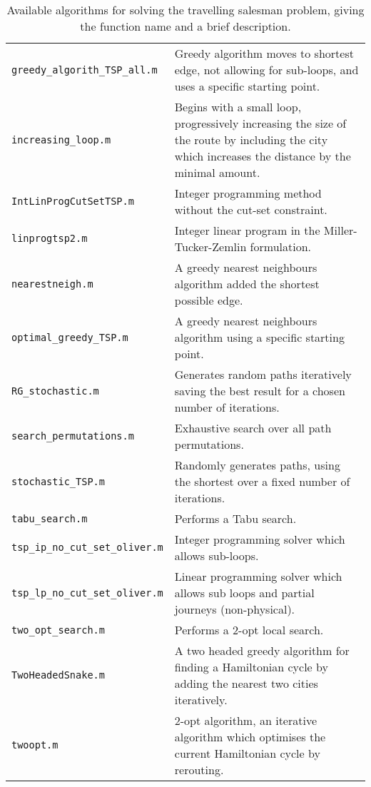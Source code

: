 \begin{table}[hbt]
\begin{center}
\begin{tabularx}{\textwidth}{|L{0.3\textwidth}|X|}
\hdashline
\texttt{greedy\_algorith\_TSP\_all.m} & Greedy algorithm moves to shortest edge, not allowing for sub-loops, and uses a specific starting point. \\
\hdashline
\texttt{increasing\_loop.m} & Begins with a small loop, progressively increasing the size of the route by including the city which increases the distance by the minimal amount. \\
\hdashline
\texttt{IntLinProgCutSetTSP.m} & Integer programming method without the cut-set constraint. \\
\hdashline
\texttt{linprogtsp2.m} &  Integer linear program in the Miller-Tucker-Zemlin formulation. \\
\hdashline
\texttt{nearestneigh.m} &  A greedy nearest neighbours algorithm added the shortest possible edge.  \\
\hdashline
\texttt{optimal\_greedy\_TSP.m} &  A greedy nearest neighbours algorithm using a specific starting point.  \\
\hdashline
\texttt{RG\_stochastic.m} &  Generates random paths iteratively saving the best result for a chosen number of iterations. \\
\hdashline
\texttt{search\_permutations.m} &  Exhaustive search over all path permutations. \\
\hdashline
\texttt{stochastic\_TSP.m} &  Randomly generates paths, using the shortest over a fixed number of iterations. \\
\hdashline
\texttt{tabu\_search.m} &  Performs a Tabu search. \\
\hdashline
\texttt{tsp\_ip\_no\_cut\_set\_oliver.m} & Integer programming solver which allows sub-loops.\\
\hdashline
\texttt{tsp\_lp\_no\_cut\_set\_oliver.m} & Linear programming solver which allows sub loops and partial journeys (non-physical).\\
\texttt{two\_opt\_search.m} &  Performs a 2-opt local search. \\
\hdashline
\texttt{TwoHeadedSnake.m} &  A two headed greedy algorithm for finding a Hamiltonian cycle by adding the nearest two cities iteratively. \\
\hdashline
\texttt{twoopt.m} &  2-opt algorithm, an iterative algorithm which optimises the current Hamiltonian cycle by rerouting. \\
\hline
\end{tabularx}
\caption{Available algorithms for solving the travelling salesman problem, giving the function name and a brief description.}
\label{tab:brief_algorithm_descriptions}
\end{center}
\end{table}

\clearpage